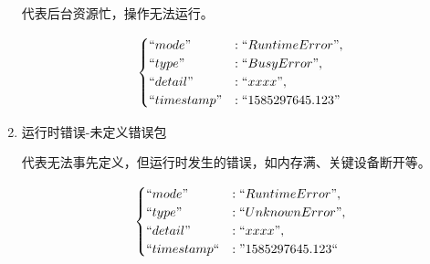 \documentclass[UTF8]{article}
\begin{document}
\begin{enumerate}
          代表后台资源忙，操作无法运行。
          \begin{fleqn}[20pt]
              \begin{align*}\begin{cases}
                      ``mode"      & : ``RuntimeError",  \\
                      ``type"      & : ``BusyError",     \\
                      ``detail"    & : ``xxxx",          \\
                      ``timestamp" & : ``1585297645.123"
                  \end{cases}\end{align*}
          \end{fleqn}

    \item 运行时错误-未定义错误包

          代表无法事先定义，但运行时发生的错误，如内存满、关键设备断开等。
          \begin{fleqn}[20pt]
              \begin{align*}\begin{cases}
                      ``mode"       & : ``RuntimeError",  \\
                      ``type"       & : ``UnknownError",  \\
                      ``detail"     & : ``xxxx",          \\
                      ``timestamp`` & : "1585297645.123``
                  \end{cases}\end{align*}
          \end{fleqn}

\end{enumerate}
\end{document}
